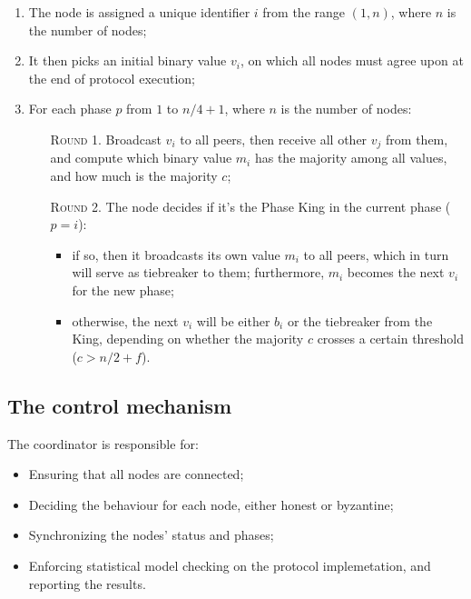 \documentclass{article}
\begin{document}
    \begin{enumerate}
        \item The node is assigned a unique identifier $i$ from the range $(1, n)$, where $n$ is the number of nodes;
        
        \item It then picks an initial binary value $v_i$, on which all nodes must agree upon at the end of protocol execution;

        \item For each phase $p$ from $1$ to $n/4 + 1$, where $n$ is the number of nodes:

        \begin{enumerate}
            \item[\textsc{Round 1}.] Broadcast $v_i$ to all peers, then receive all other $v_j$ from them, and compute which binary value $m_i$ has the majority among all values, and how much is the majority $c$;
            \item[\textsc{Round 2}.] The node decides if it's the Phase King in the current phase ($p = i$):

            \begin{itemize}
                \item if so, then it broadcasts its own value $m_i$ to all peers, which in turn will serve as tiebreaker to them; furthermore, $m_i$ becomes the next $v_i$ for the new phase;
                \item otherwise, the next $v_i$ will be either $b_i$ or the tiebreaker from the King, depending on whether the majority $c$ crosses a certain threshold ($c > n / 2 + f$).
            \end{itemize}

        \end{enumerate}

    \end{enumerate}


    \subsection{The control mechanism}

    The coordinator is responsible for:

    \begin{itemize}
        \item Ensuring that all nodes are connected;
        \item Deciding the behaviour for each node, either honest or byzantine;
        \item Synchronizing the nodes' status and phases;
        \item Enforcing statistical model checking on the protocol implemetation, and reporting the results.
    \end{itemize}
\end{document}
